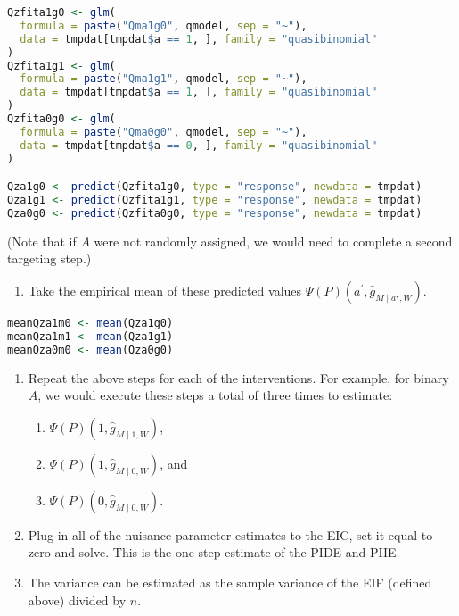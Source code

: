 \documentclass[
  12pt,
]{book}
\providecommand{\tightlist}{%
  \setlength{\itemsep}{0pt}\setlength{\parskip}{0pt}}
\theoremstyle{definition}
\theoremstyle{definition}
\theoremstyle{definition}
\newcommand{\1}{\mathbbm{1}}
\begin{document}
\begin{lstlisting}[language=R]
Qzfita1g0 <- glm(
  formula = paste("Qma1g0", qmodel, sep = "~"),
  data = tmpdat[tmpdat$a == 1, ], family = "quasibinomial"
)
Qzfita1g1 <- glm(
  formula = paste("Qma1g1", qmodel, sep = "~"),
  data = tmpdat[tmpdat$a == 1, ], family = "quasibinomial"
)
Qzfita0g0 <- glm(
  formula = paste("Qma0g0", qmodel, sep = "~"),
  data = tmpdat[tmpdat$a == 0, ], family = "quasibinomial"
)

Qza1g0 <- predict(Qzfita1g0, type = "response", newdata = tmpdat)
Qza1g1 <- predict(Qzfita1g1, type = "response", newdata = tmpdat)
Qza0g0 <- predict(Qzfita0g0, type = "response", newdata = tmpdat)
\end{lstlisting}

(Note that if \(A\) were not randomly assigned, we would need to complete a
second targeting step.)

\begin{enumerate}
\def\labelenumi{\arabic{enumi}.}
\setcounter{enumi}{7}
\tightlist
\item
  Take the empirical mean of these predicted values
  \(\Psi(P)(a^\prime, \hat{g}_{M \mid a^{\star}, W})\).
\end{enumerate}

\begin{lstlisting}[language=R]
meanQza1m0 <- mean(Qza1g0)
meanQza1m1 <- mean(Qza1g1)
meanQza0m0 <- mean(Qza0g0)
\end{lstlisting}

\begin{enumerate}
\def\labelenumi{\arabic{enumi}.}
\setcounter{enumi}{8}
\item
  Repeat the above steps for each of the interventions. For example, for
  binary \(A\), we would execute these steps a total of three times to
  estimate:

  \begin{enumerate}
  \def\labelenumii{\arabic{enumii}.}
  \tightlist
  \item
    \(\Psi(P)(1,\hat{g}_{M \mid 1, W})\),
  \item
    \(\Psi(P)(1,\hat{g}_{M \mid 0, W})\), and
  \item
    \(\Psi(P)(0,\hat{g}_{M \mid 0, W})\).
  \end{enumerate}
\item
  Plug in all of the nuisance parameter estimates to the EIC, set it equal to zero and solve. This is the one-step estimate of the PIDE and PIIE.
\item
  The variance can be estimated as the sample variance of the EIF (defined
  above) divided by \(n\).
\end{enumerate}
\end{document}
